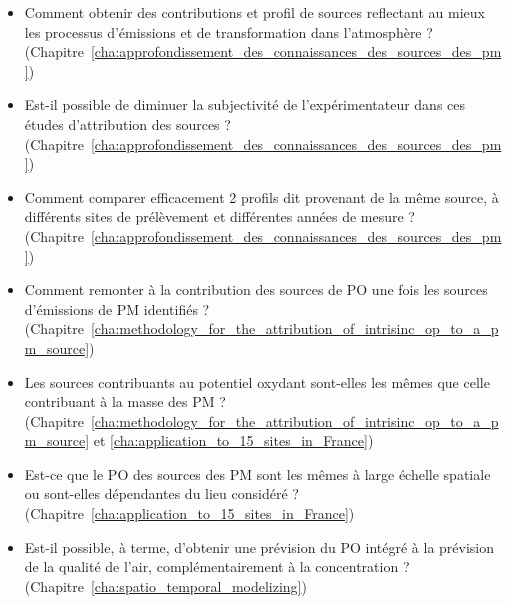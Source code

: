 \begin{itemize}
    \item Comment obtenir des contributions et profil de sources reflectant au mieux les
        processus d'émissions et de transformation dans l'atmosphère ?
        (Chapitre~\ref{cha:approfondissement_des_connaissances_des_sources_des_pm})
    \item Est-il possible de diminuer la subjectivité de l'expérimentateur dans ces
        études d'attribution des sources ?
        (Chapitre~\ref{cha:approfondissement_des_connaissances_des_sources_des_pm})
    \item Comment comparer efficacement 2 profils dit provenant de la même source, à
        différents sites de prélèvement et différentes années de mesure ?
        (Chapitre~\ref{cha:approfondissement_des_connaissances_des_sources_des_pm})
    \item Comment remonter à la contribution des sources de PO une fois les sources
        d'émissions de PM identifiés ?
        (Chapitre~\ref{cha:methodology_for_the_attribution_of_intrisinc_op_to_a_pm_source})
    \item Les sources contribuants au potentiel oxydant sont-elles les mêmes que celle
        contribuant à la masse des PM ?
        (Chapitre~\ref{cha:methodology_for_the_attribution_of_intrisinc_op_to_a_pm_source}
        et \ref{cha:application_to_15_sites_in_France})
    \item Est-ce que le PO des sources des PM sont les mêmes à large échelle spatiale ou
        sont-elles dépendantes du lieu considéré ?
        (Chapitre~\ref{cha:application_to_15_sites_in_France})
    \item Est-il possible, à terme, d'obtenir une prévision du PO intégré à la prévision de la
        qualité de l'air, complémentairement à la concentration ?
        (Chapitre~\ref{cha:spatio_temporal_modelizing})
\end{itemize}

